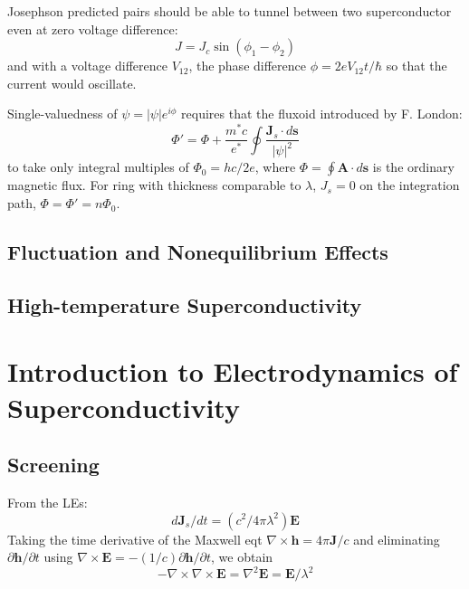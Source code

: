 \documentclass[8pt,a4paper,twocolumn]{article} %
\numberwithin{equation}{section} %
\begin{document}
			Josephson predicted pairs should be able to tunnel between two superconductor even at zero voltage difference:
			\begin{equation}
				J=J_c \sin (\phi_1- \phi_2)
			\end{equation}
			and with a voltage difference $V_{12}$, the phase difference $\phi = 2eV_{12}t/\hbar $ so that the current would oscillate.

			Single-valuedness of $\psi = |\psi| e^{i \phi} $ requires that the fluxoid introduced by F. London:
			\begin{equation}
				\Phi'=\Phi+\frac{m^* c}{e^*} \oint \frac{\bm J_s \cdot d \bm s}{|\psi|^2}
			\end{equation}
			to take only integral multiples of $\Phi_0 = hc/2e $, where $\Phi = \oint \bm A\cdot d\bm s$ is the ordinary magnetic flux. For ring with thickness comparable to $\lambda$, $J_s=0$ on the integration path, $\Phi=\Phi'=n \Phi_0$.

		\subsection{Fluctuation and Nonequilibrium Effects} %
		\label{sub:fluctuation_and_nonequilibrium_effects}
			

		\subsection{High-temperature Superconductivity} %
		\label{sub:high_temperature_superconductivity}
		


	\section{Introduction to Electrodynamics of Superconductivity} %
	\label{sec:intro_to_electrodynamics_of_superconductivity}
		\subsection{Screening} %
		\label{sub:screening}
			From the LEs:
			\begin{equation}
				d\bm J_s/dt = (c^2/4 \pi \lambda^2	)\bm E
			\end{equation}
			Taking the time derivative of the Maxwell eqt $ \nabla \times \bm h=4 \pi \bm J/c $ and eliminating $\partial \bm h/\partial t $ using $ \nabla \times \bm E=-(1/c) \partial \bm h/\partial t $, we obtain
			\begin{equation}
				-\nabla \times \nabla\times\bm E=\nabla^2\bm E = \bm E/\lambda^2
			\end{equation}
\end{document}
